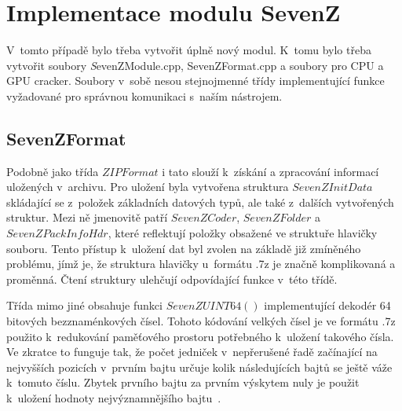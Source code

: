 %

\section{Implementace modulu SevenZ}
V~tomto případě bylo třeba vytvořit úplně nový modul. K~tomu bylo třeba vytvořit soubory {\textit
SevenZModule.cpp, SevenZFormat.cpp} a soubory pro CPU a GPU cracker. Soubory v~sobě nesou
stejnojmenné třídy implementující funkce vyžadované pro správnou komunikaci s~naším nástrojem.

\subsection{SevenZFormat}
Podobně jako třída $ZIPFormat$ i tato slouží k~získání a zpracování informací uložených
v~archivu. Pro uložení byla vytvořena struktura $SevenZInitData$ skládající se z~položek základních
datových typů, ale také z~dalších vytvořených struktur. Mezi ně jmenovitě patří $SevenZCoder$,
$SevenZFolder$ a $SevenZPackInfoHdr$, které reflektují položky obsažené ve struktuře hlavičky
souboru. Tento přístup k~uložení dat byl zvolen na základě již zmíněného problému, jímž je, že
struktura hlavičky u~formátu .7z je značně komplikovaná a proměnná. Čtení struktury ulehčují
odpovídající funkce v~této třídě.

 Třída mimo jiné obsahuje funkci $SevenZUINT64()$ implementující dekodér 64 bitových
bezznaménkových čísel. Tohoto kódování velkých čísel je ve formátu .7z použito k~redukování
paměťového prostoru potřebného k~uložení takového čísla. Ve zkratce to funguje tak, že počet
jedniček v~nepřerušené řadě začínající na nejvyšších pozicích v~prvním bajtu určuje kolik
následujících bajtů se ještě váže k~tomuto číslu. Zbytek prvního bajtu za prvním výskytem nuly je
použit k~uložení hodnoty nejvýznamnějšího bajtu~\cite{Pavlov:2010}. 

